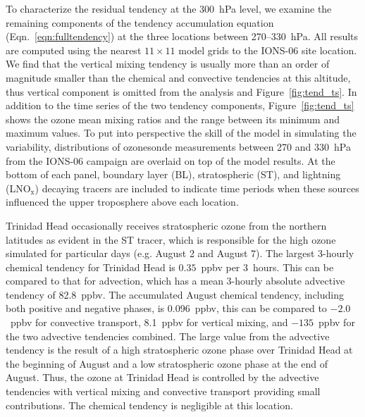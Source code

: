 To characterize the residual tendency at the 300~hPa level, we examine the remaining
components of the tendency accumulation equation (Eqn.~\ref{eqn:fulltendency}) at the three
locations between 270--330~hPa. All results are computed using the nearest $11\times11$ model grids to the IONS-06 site location.
We find that the vertical mixing tendency is usually more than an order of magnitude smaller than the
chemical and convective tendencies at this altitude, thus vertical component is omitted from the
analysis and Figure~\ref{fig:tend_ts}. In addition to the time series of the two tendency components,
Figure~\ref{fig:tend_ts} shows the ozone mean mixing ratios and the range between its minimum and maximum values. To put into
perspective the skill of the model in simulating the variability, distributions of ozonesonde measurements
between 270 and 330~hPa from the IONS-06 campaign \citep{Thompson:2008rp} are
overlaid on top of the model results. At the bottom of each panel, boundary layer (BL), stratospheric
(ST), and lightning (LNO$_{\mathrm{x}}$) decaying tracers are included to indicate time periods
when these sources influenced the upper troposphere above each location.

Trinidad Head occasionally receives stratospheric ozone from the northern latitudes as evident in the ST tracer, which is
responsible for the high ozone simulated for particular days
(e.g. August 2 and August 7). The largest 3-hourly chemical tendency for Trinidad Head is
$0.35$~ppbv per 3~hours. This can be compared to that for advection, which has a mean
3-hourly absolute advective tendency of 82.8~ppbv. The accumulated August chemical
tendency, including both positive and negative phases, is 0.096~ppbv, this can be compared
to $-2.0$~ppbv for convective transport, 8.1~ppbv for vertical mixing, and $-135$~ppbv for
the two advective tendencies combined. The large value from the advective tendency
is the result of a high stratospheric ozone phase over Trinidad Head at the beginning of August
and a low stratospheric ozone phase at the end of August. Thus, the ozone at Trinidad Head is
controlled by the advective tendencies with vertical mixing and convective transport providing
small contributions. The chemical tendency is negligible at this location.

